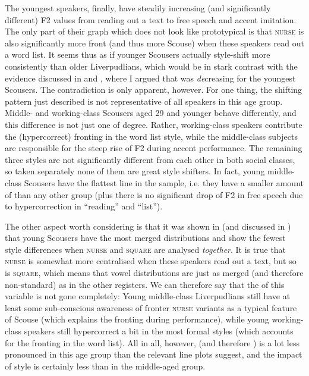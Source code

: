 \largerpage
The youngest speakers, finally, have steadily increasing (and significantly different) F2 values from reading out a text to free speech and accent imitation.
The only part of their graph which does not look like prototypical  is that \textsc{nurse} is also significantly more front (and thus more Scouse) when these speakers read out a word list.
It seems thus as if younger Scousers actually style-shift more consistently than older Liverpudlians, which would be in stark contrast with the evidence discussed in  and , where I argued that  was \emph{de}creasing for the youngest Scousers.
The contradiction is only apparent, however.
For one thing, the shifting pattern just described is not representative of all speakers in this age group.
Middle- and working-class Scousers aged 29 and younger behave differently, and this difference is not just one of degree.
Rather, working-class speakers contribute the (hypercorrect) fronting in the word list style, while the middle-class subjects are responsible for the steep rise of F2 during accent performance.
The remaining three styles are not significantly different from each other in both social classes, so taken separately none of them are great style shifters.
In fact, young middle-class Scousers have the flattest line in the sample, i.e. they have a smaller amount of  than any other group (plus there is no significant drop of F2 in free speech due to hypercorrection in ``reading'' and ``list'').

The other aspect worth considering is that it was shown in  (and discussed in ) that young Scousers have the most merged distributions and show the fewest style differences when \textsc{nurse} and \textsc{square} are analysed \emph{together}.
It is true that \textsc{nurse} is somewhat more centralised when these speakers read out a text, but so is \textsc{square}, which means that vowel distributions are just as merged (and therefore non-standard) as in the other registers.
We can therefore say that the  of this variable is not gone completely:
Young middle-class Liverpudlians still have at least some sub-conscious awareness of fronter \textsc{nurse} variants as a typical feature of Scouse (which explains the fronting during performance), while young working-class speakers still hypercorrect a bit in the most formal styles (which accounts for the fronting in the word list).
All in all, however,  (and therefore ) is a lot less pronounced in this age group than the relevant line plots suggest, and the impact of style is certainly less than in the middle-aged group.

